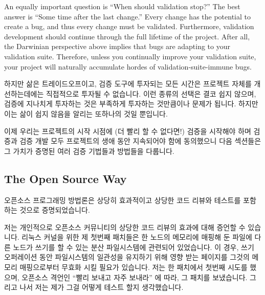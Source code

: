 An equally important question is ``When should validation stop?''
The best answer is ``Some time after the last change.''
Every change has the potential to create a bug, and thus every
change must be validated.
Furthermore, validation development should continue through the
full lifetime of the project.
After all, the Darwinian perspective above implies that bugs are
adapting to your validation suite.
Therefore, unless you continually improve your validation suite, your
project will naturally accumulate hordes of validation-suite-immune bugs.

\fi

하지만 삶은 트레이드오프이고, 검증 도구에 투자되는 모든 시간은 프로젝트 자체를
개선하는데에는 직접적으로 투자될 수 없습니다.
이런 종류의 선택은 결코 쉽지 않으며, 검증에 지나치게 투자하는 것은 부족하게
투자하는 것만큼이나 문제가 됩니다.
하지만 이는 삶이 쉽지 않음을 알리는 또하나의 것일 뿐입니다.

이제 우리는 프로젝트의 시작 시점에 (더 빨리 할 수 없다면!) 검증을 시작해야 하며
검증과 검증 개발 모두 프로젝트의 생애 동안 지속되어야 함에 동의했으니 다음
섹션들은 그 가치가 증명된 여러 검증 기법들과 방법들을 다룹니다.

\subsection{The Open Source Way}
\label{sec:debugging:The Open Source Way}

오픈소스 프로그래밍 방법론은 상당히 효과적이고 상당한 코드 리뷰와 테스트를
포함하는 것으로 증명되었습니다.

저는 개인적으로 오픈소스 커뮤니티의 상당한 코드 리뷰의 효과에 대해 증언할 수
있습니다.
리눅스 커널을 위한 제 첫번째 패치들은 한 노드의 메모리에 매핑해 둔 파일에 다른
노드가 쓰기를 할 수 있는 분산 파일시스템에 관련되어 있었습니다.
이 경우, 쓰기 오퍼레이션 동안 파일시스템의 일관성을 유지하기 위해 영향 받는
페이지를 그것의 메모리 매핑으로부터 무효화 시킬 필요가 있습니다.
저는 한 패치에서 첫번째 시도를 했으며, 오픈소스 격언인 ``빨리 보내고 자주
보내라'' 에 따라, 그 패치를 보냈습니다.
그리고 나서 저는 제가 그걸 어떻게 테스트 할지 생각했습니다.

